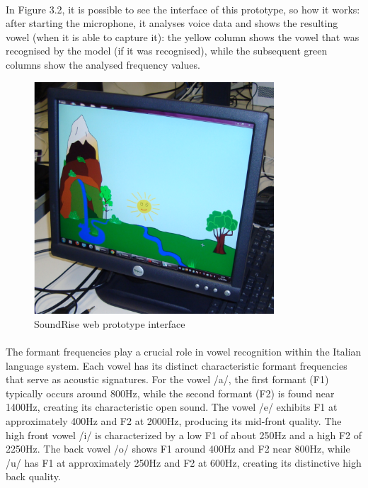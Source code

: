 \paragraph{}
In Figure 3.2, it is possible to see the interface of this prototype, so how it works: after starting the microphone, it analyses voice data and shows the resulting vowel (when it is able to capture it): the yellow column shows the vowel that was recognised by the model (if it was recognised), while the subsequent green columns show the analysed frequency values.

\begin{figure}[h]
    \centering
    \includegraphics[width=0.8\textwidth]{res/images/soundrise-1.png}
    \caption{SoundRise web prototype interface}
    \label{fig:soundrise-1}
\end{figure}



\paragraph{}
The formant frequencies play a crucial role in vowel recognition within the Italian language system. Each vowel has its distinct characteristic formant frequencies that serve as acoustic signatures. For the vowel /a/, the first formant (F1) typically occurs around 800Hz, while the second formant (F2) is found near 1400Hz, creating its characteristic open sound. The vowel /e/ exhibits F1 at approximately 400Hz and F2 at 2000Hz, producing its mid-front quality. The high front vowel /i/ is characterized by a low F1 of about 250Hz and a high F2 of 2250Hz. The back vowel /o/ shows F1 around 400Hz and F2 near 800Hz, while /u/ has F1 at approximately 250Hz and F2 at 600Hz, creating its distinctive high back quality.

